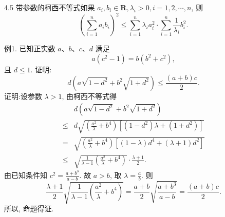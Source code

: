 
4.5 带参数的柯西不等式如果 $a_i, b_i \in \mathbf{R}, \lambda_i>0, i=1,2, \cdots, n$, 则
$$
\left(\sum_{i=1}^n a_i b_i\right)^2 \leqslant \sum_{i=1}^n \lambda_i a_i^2 \cdot \sum_{i=1}^n \frac{1}{\lambda_i} b_i^2 .
$$



例1. 已知正实数 $a 、 b 、 c 、 d$ 满足
$$
a\left(c^2-1\right)=b\left(b^2+c^2\right),
$$
且 $d \leqslant 1$. 证明:
$$
d\left(a \sqrt{1-d^2}+b^2 \sqrt{1+d^2}\right) \leqslant \frac{(a+b) c}{2} .
$$
证明:设参数 $\lambda>1$, 由柯西不等式得
$$
\begin{aligned}
& d\left(a \sqrt{1-d^2}+b^2 \sqrt{1+d^2}\right) \\
\leqslant & d \sqrt{\left(\frac{a^2}{\lambda}+b^4\right)\left[\left(1-d^2\right) \lambda+\left(1+d^2\right)\right]} \\
= & \sqrt{\left(\frac{a^2}{\lambda}+b^4\right)\left[(1-\lambda) d^4+(\lambda+1) d^2\right]} \\
\leqslant & \sqrt{\frac{1}{\lambda-1}\left(\frac{a^2}{\lambda}+b^4\right)} \cdot \frac{\lambda+1}{2} .
\end{aligned}
$$
由已知条件知 $c^2=\frac{a+b^3}{a-b}$. 故 $a>b$, 取 $\lambda=\frac{a}{b}$. 则
$$
\frac{\lambda+1}{2} \sqrt{\frac{1}{\lambda-1}\left(\frac{a^2}{\lambda}+b^4\right)}=\frac{a+b}{2} \sqrt{\frac{a+b^3}{a-b}}=\frac{(a+b) c}{2} .
$$
所以, 命题得证.



